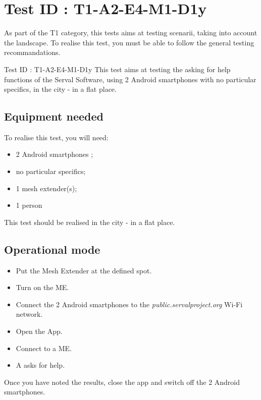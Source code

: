 \documentclass[oneside]{book}
\begin{document}
\section{Test ID : T1-A2-E4-M1-D1y}
\begin{itshape}
As part of the T1 category, this tests aims at testing scenarii, taking into account the landscape. 
To realise this test, you must be able to follow the general testing recommandations.
\end{itshape}
\newline
Test ID : T1-A2-E4-M1-D1y
 This test aims at testing the asking for help functions of the Serval Software, using 2 Android smartphones with no particular specifics, in the city - in a flat place.
\subsection{Equipment needed} To realise this test, you will need:
\begin{itemize}
\item 2 Android smartphones ;
\item no particular specifics;
\item 1 mesh extender(s);
\item 1 person
\end{itemize}
This test should be realised in the city - in a flat place.
\subsection{Operational mode} \begin{itemize}
\item Put the Mesh Extender at the defined spot.
\item Turn on the ME.
\item Connect the 2 Android smartphones to the \emph{public.servalproject.org} Wi-Fi network.
\item Open the App.
\item Connect to a ME.
\item A asks for help.
\end{itemize}
Once you have noted the results, close the app and switch off the 2 Android smartphones.
\end{document}

